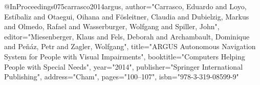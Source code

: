 @InProceedings{075carrasco2014argus,
author="Carrasco, Eduardo
and Loyo, Est{\'i}baliz
and Otaegui, Oihana
and F{\"o}sleitner, Claudia
and Dubielzig, Markus
and Olmedo, Rafael
and Wasserburger, Wolfgang
and Spiller, John",
editor="Miesenberger, Klaus
and Fels, Deborah
and Archambault, Dominique
and Pe{\v{n}}{\'a}z, Petr
and Zagler, Wolfgang",
title="ARGUS Autonomous Navigation System for People with Visual Impairments",
booktitle="Computers Helping People with Special Needs",
year="2014",
publisher="Springer International Publishing",
address="Cham",
pages="100--107",
isbn="978-3-319-08599-9"
}